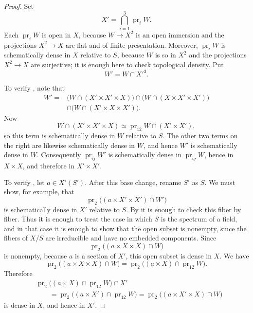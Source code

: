 \begin{proof}
Set
\[
  X'=\bigcap_{i=1}^{3}\operatorname{pr}_i W.
\]
Each \(\operatorname{pr}_iW\) is open in \(X\), because
\(W\to X^2\) is an open immersion and the projections
\(X^2\to X\) are flat and of finite presentation. Moreover,
\(\operatorname{pr}_iW\) is schematically dense in \(X\) relative
to \(S\), because \(W\) is so in \(X^2\) and the projections
\(X^2\to X\) are surjective; it is enough here to check
topological density. Put
\[
  W'=W\cap {X'}^3.
\]

To verify , note that
\[
\begin{aligned}
  W'={}&
  \bigl(W\cap(X'\times X'\times X)\bigr)
  \cap\bigl(W\cap(X\times X'\times X')\bigr)\\
  &\cap\bigl(W\cap(X'\times X\times X')\bigr).
\end{aligned}
\]
Now
\[
  W\cap(X'\times X'\times X)
  \simeq \operatorname{pr}_{12}W\cap(X'\times X'),
\]
so this term is schematically dense in \(W\) relative to \(S\).
The other two terms on the right are likewise schematically dense
in \(W\), and hence \(W'\) is schematically dense in \(W\).
Consequently \(\operatorname{pr}_{ij}W'\) is schematically dense
in \(\operatorname{pr}_{ij}W\), hence in \(X\times X\), and
therefore in \(X'\times X'\).

To verify , let \(a\in X'(S')\). After this base change, rename
\(S'\) as \(S\). We must show, for example, that
\[
  \operatorname{pr}_2\bigl((a\times X'\times X')\cap W'\bigr)
\]
is schematically dense in \(X'\) relative to \(S\). By  it is
enough to check this fiber by fiber. Thus it is enough to treat the
case in which \(S\) is the spectrum of a field, and in that case it
is enough to show that the open subset is nonempty, since the
fibers of \(X/S\) are irreducible and have no embedded components.
Since
\[
  \operatorname{pr}_2\bigl((a\times X\times X)\cap W\bigr)
\]
is nonempty, because \(a\) is a section of \(X'\), this open subset
is dense in \(X\). We have
\[
  \operatorname{pr}_2\bigl((a\times X\times X)\cap W\bigr)
  =
  \operatorname{pr}_2\bigl((a\times X)
    \cap\operatorname{pr}_{12}W\bigr).
\]
Therefore
\[
\begin{aligned}
  &\operatorname{pr}_2\bigl((a\times X)
    \cap\operatorname{pr}_{12}W\bigr)\cap X'\\
  &\qquad =
  \operatorname{pr}_2\bigl((a\times X')
    \cap\operatorname{pr}_{12}W\bigr)
  =
  \operatorname{pr}_2\bigl((a\times X'\times X)\cap W\bigr)
\end{aligned}
\]
is dense in \(X\), and hence in \(X'\).


\end{proof}
